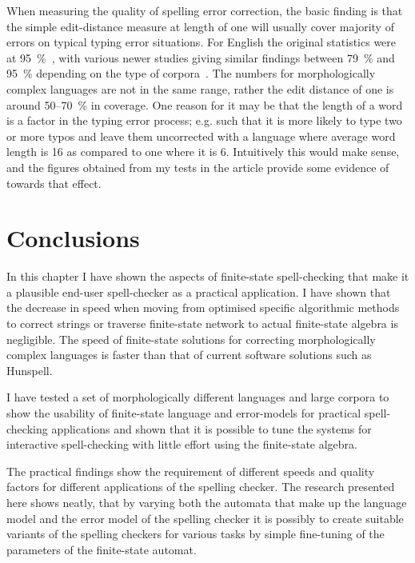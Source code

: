 \documentclass[officiallayout]{unihelcompling}
\begin{document}
When measuring the quality of spelling error correction, the basic finding is
that the simple edit-distance measure at length of one will usually cover
majority of errors on typical typing error situations. For English the original
statistics were at 95~\%~\citep{damerau1964technique}, with various newer
studies giving similar findings between 79~\% and 95~\% depending on the type
of corpora~\citep{kukich1992spelling}.  The numbers for morphologically complex
languages are not in the same range, rather the edit distance of one is around
50--70~\% in coverage. One reason for it may be that the length of a word is
a factor in the typing error process; e.g. such that it is more likely to type
two or more typos and leave them uncorrected with a language where average word
length is 16 as compared to one where it is 6. Intuitively this would make
sense, and the figures obtained from my tests in the article provide some
evidence of towards that effect.

\section{Conclusions}

In this chapter I have shown the aspects of finite-state spell-checking that
make it a plausible end-user spell-checker as a practical application. I have
shown that the decrease in speed when moving from optimised specific
algorithmic methods to correct strings or traverse finite-state network to
actual finite-state algebra is negligible. The speed of finite-state solutions
for correcting morphologically complex languages is faster than
that of current software solutions such as Hunspell.

I have tested a set of morphologically different languages and
large corpora to show the usability of finite-state language and error-models
for practical spell-checking applications and shown that it is possible to tune
the systems for interactive spell-checking with little effort using the
finite-state algebra.

The practical findings show the requirement of different speeds and quality
factors for different applications of the spelling checker. The research
presented here shows neatly, that by varying both the automata that make up
the language model and the error model of the spelling checker it is possibly
to create suitable variants of the spelling checkers for various tasks by
simple fine-tuning of the parameters of the finite-state automat.
\end{document}
